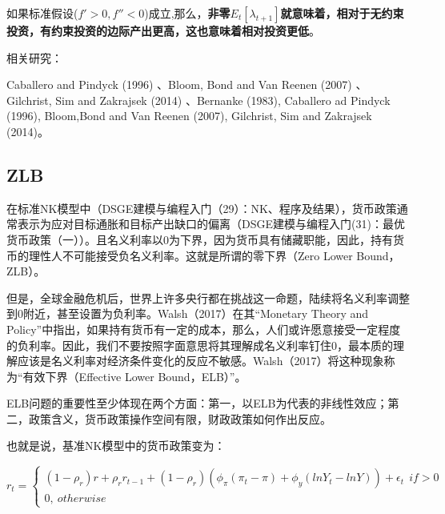 \documentclass[cn,10pt,math=newtx,citestyle=gb7714-2015,bibstyle=gb7714-2015]{elegantbook}
\begin{document}
如果标准假设($f'>0,f''<0$)成立,那么，\textbf{非零$E_t[\lambda_{t+1}]$就意味着，相对于无约束投资，有约束投资的边际产出更高，这也意味着相对投资更低}。


相关研究：

Caballero and Pindyck (1996) 、Bloom, Bond and Van Reenen (2007) 、Gilchrist, Sim and Zakrajsek (2014) 、Bernanke (1983), Caballero ad Pindyck (1996), Bloom,Bond and Van Reenen (2007), Gilchrist, Sim and Zakrajsek (2014)。


\subsection{ZLB}

在标准NK模型中（DSGE建模与编程入门（29）：NK、程序及结果），货币政策通常表示为应对目标通胀和目标产出缺口的偏离（DSGE建模与编程入门(31)：最优货币政策（一））。且名义利率以0为下界，因为货币具有储藏职能，因此，持有货币的理性人不可能接受负名义利率。这就是所谓的零下界（Zero Lower Bound，ZLB）。

但是，全球金融危机后，世界上许多央行都在挑战这一命题，陆续将名义利率调整到0附近，甚至设置为负利率。Walsh（2017）在其“Monetary Theory and Policy”中指出，如果持有货币有一定的成本，那么，人们或许愿意接受一定程度的负利率。因此，我们不要按照字面意思将其理解成名义利率钉住0，最本质的理解应该是名义利率对经济条件变化的反应不敏感。Walsh（2017）将这种现象称为“有效下界（Effective Lower Bound，ELB）”。

ELB问题的重要性至少体现在两个方面：第一，以ELB为代表的非线性效应；第二，政策含义，货币政策操作空间有限，财政政策如何作出反应。

也就是说，基准NK模型中的货币政策变为：

\begin{equation}\label{label}
	r_t=
	\begin{cases}
		(1-\rho_r)r+\rho_rr_{t-1}+(1-\rho_r)(\phi_{\pi}(\pi_t-\pi)+\phi_y(lnY_t-lnY))+\epsilon_t~~if >0\\
		0,~otherwise
	\end{cases}
\end{equation}
\end{document}
